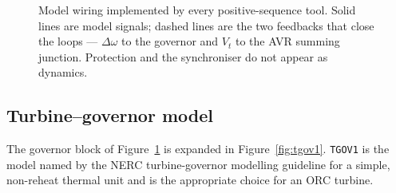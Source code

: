 \begin{figure}[htbp]
{}
  \caption{Model wiring implemented by every positive-sequence tool. Solid lines
  are model signals; dashed lines are the two feedbacks that close the loops ---
  $\Delta\omega$ to the governor and $V_t$ to the AVR summing junction.
  Protection and the synchroniser do not appear as dynamics.}
  \label{fig:model-wiring}
\end{figure}

\subsection{Turbine--governor model}
The governor block of Figure~\ref{fig:model-wiring} is expanded in
Figure~\ref{fig:tgov1}. \texttt{TGOV1} is the model named by the NERC
turbine-governor modelling guideline for a simple, non-reheat thermal unit and
is the appropriate choice for an ORC turbine.


